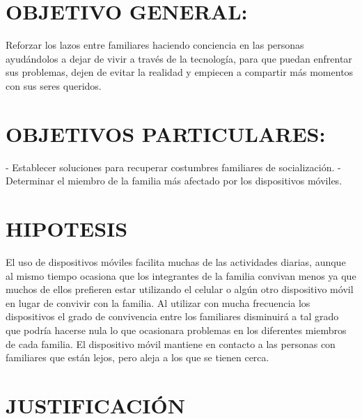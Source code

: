 \documentclass[10pt,a4paper]{article}
\begin{document}
		
		
	\section{OBJETIVO GENERAL:} 
	
	
Reforzar los lazos entre familiares haciendo  conciencia en las personas ayud{\'a}ndolos a dejar de vivir a trav{\'e}s de la tecnolog{\'i}a, para que puedan enfrentar sus problemas, dejen de evitar la realidad y empiecen a compartir m{\'a}s momentos con sus seres queridos.	


	
\section{OBJETIVOS  PARTICULARES:} 



-	Establecer soluciones para recuperar costumbres familiares de socializaci{\'o}n.
-	Determinar el miembro de la familia m{\'a}s afectado por los dispositivos m{\'o}viles.

	\section{HIPOTESIS}
	
El uso de dispositivos m{\'o}viles facilita muchas de las actividades diarias, aunque al mismo tiempo ocasiona que los integrantes de la familia convivan menos ya que muchos de ellos prefieren estar utilizando el celular o alg{\'u}n otro dispositivo m{\'o}vil en lugar de convivir con la familia.
Al utilizar con mucha frecuencia los dispositivos el grado de convivencia entre los familiares disminuir{\'a} a tal grado que podr{\'i}a hacerse nula lo que ocasionara problemas en los diferentes miembros de cada familia.
El dispositivo m{\'o}vil mantiene en contacto a las personas con familiares que est{\'a}n lejos, pero aleja a los que se tienen cerca. 

	
	\section{JUSTIFICACI{\'O}N}
	
\end{document}
